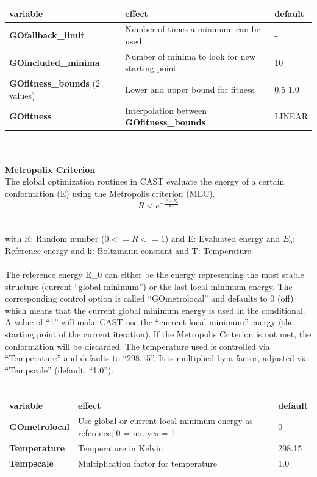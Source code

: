 \documentclass[10pt,a4paper]{article} %
\begin{document}
	\begin{tabularx}{\textwidth}{l|X|X}
	variable & effect & default \\
		\hline
		\textbf{GOfallback\_limit} & Number of times a minimum can be used & - \\
		\textbf{GOincluded\_minima} & Number of minima to look for new starting point & 10 \\
		\textbf{GOfitness\_bounds} (2 values) & Lower and upper bound for fitness & 0.5 1.0 \\
		\textbf{GOfitness} & Interpolation between \textbf{GOfitness\_bounds} & LINEAR \\
	\end{tabularx}
	\\~\\

	\textbf{Metropolix Criterion} \\
	The global optimization routines in \ac{CAST} evaluate the energy of a certain conformation (E) using the Metropolis criterion (MEC).
	\begin{equation}
	R < e^{-\frac{E-E_0}{kT}}
	\end{equation}
	\\~\\
	with R: Random number ($0 <= R <= 1$)
	and E: Evaluated energy
	and $E_0$: Reference energy
	and k: Boltzmann constant
	and T: Temperature\\~\\
	
	The reference energy E\_0 can either be the energy representing the most stable structure (current ``global minimum'') or the last local minimum energy. The corresponding control option is called ``GOmetrolocal'' and defaults to 0 (off) which means that the current global minimum energy is used in the conditional. A value of ``1'' will make \ac{CAST} use the ``current local minimum'' energy (the starting point of the current iteration). If the Metropolis Criterion is not met, the conformation will be discarded.
	The temperature used is controlled via ``Temperature'' and defaults to ``298.15''. It is multiplied by a factor, adjusted via ``Tempscale'' (default: ``1.0'').\\~\\
	
	\begin{tabularx}{\textwidth}{l|X|X}
		variable & effect & default\\
		\hline
		\textbf{GOmetrolocal} & Use global or current local minimum energy as reference; 0 = no, yes = 1 & 0 \\
		\textbf{Temperature} & Temperature in Kelvin & 298.15 \\
		\textbf{Tempscale} & Multiplication factor for temperature & 1.0
	\end{tabularx}
	
\end{document}
